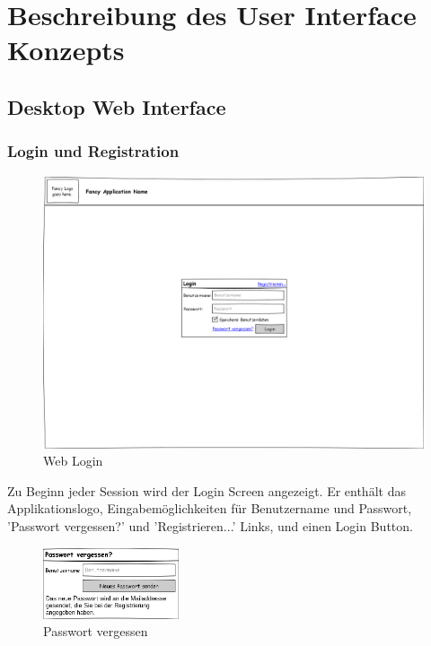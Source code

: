 \section{Beschreibung des User Interface Konzepts}

\subsection{Desktop Web Interface}

\subsubsection{Login und Registration} \label{subsubsection:login}

\begin{figure}[htl]
\centering
\includegraphics[width=\textwidth]{img/web_login}
\caption{Web Login}
\label{fig:web_login}
\end{figure}

Zu Beginn jeder Session wird der Login Screen angezeigt. Er enth\"alt das
Applikationslogo, Eingabem\"oglichkeiten f\"ur Benutzername und Passwort,
'Passwort vergessen?'  und 'Registrieren...'  Links, und einen Login Button.

\begin{figure}[htl]
\centering
\includegraphics[width=4cm]{img/web_pass_recovery}
\caption{Passwort vergessen}
\label{fig:web_pass_recovery}
\end{figure}

